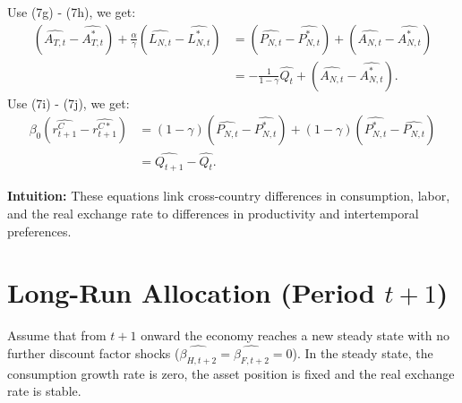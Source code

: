 \documentclass[a4paper,12pt]{article} %
\theoremstyle{nonitalic}
\begin{document}
Use (7g) - (7h), we get:
\begin{align*}
    (\widehat{A_{T,t}} - \widehat{A_{T,t}^*}) + \frac{\alpha}{\gamma}(\widehat{L_{N,t}} - \widehat{L_{N,t}^*}) &= (\widehat{P_{N,t}} - \widehat{P_{N,t}^*}) + (\widehat{A_{N,t}} - \widehat{A_{N,t}^*}) \\
    &= - \frac{1}{1-\gamma} \widehat{Q_t} + (\widehat{A_{N,t}} - \widehat{A_{N,t}^*}) \tag{9d}.
\end{align*}
Use (7i) - (7j), we get:
\begin{align*}
    \beta_0(\widehat{r_{t+1}^C} - \widehat{r_{t+1}^{C*}}) &= (1-\gamma)(\widehat{P_{N,t}} - \widehat{P_{N,t}^*}) + (1-\gamma)(\widehat{P_{N,t}^*} - \widehat{P_{N,t}}) \\
    &= \widehat{Q_{t+1}} - \widehat{Q_t} \tag{9e}.
\end{align*}


\textbf{Intuition:} These equations link cross-country differences in consumption, labor, and the real exchange rate to differences in productivity and intertemporal preferences.

\section{Long-Run Allocation (Period $t+1$)}

Assume that from $ t+1 $ onward the economy reaches a new steady state with no further discount factor shocks ($ \widehat{\beta_{H,t+2}} = \widehat{\beta_{F,t+2}} = 0 $).
In the steady state, the consumption growth rate is zero, the asset position is fixed and the real exchange rate is stable. 
\end{document}
